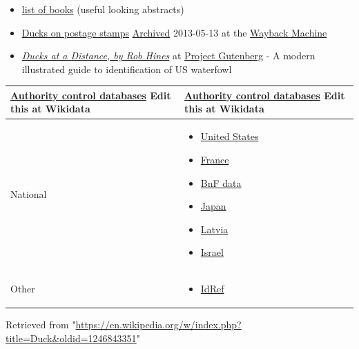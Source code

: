 \documentclass[11pt,a4paper]{article}
\begin{document}
\begin{itemize}
\item \href{https://web.archive.org/web/20060613210555/http://seaducks.org/subjects/MIGRATION\%20AND\%20FLIGHT.htm}{list of books} (useful looking abstracts)
\item \href{http://www.stampsbook.org/subject/Duck.html}{Ducks on postage stamps} \href{https://web.archive.org/web/20130513022903/http://www.stampsbook.org/subject/Duck.html}{Archived} 2013-05-13 at the \href{/wiki/Wayback\_Machine}{Wayback Machine}
\item \href{https://gutenberg.org/ebooks/18884}{\textit{Ducks at a Distance, by Rob Hines}} at \href{/wiki/Project\_Gutenberg}{Project Gutenberg} - A modern illustrated guide to identification of US waterfowl
\end{itemize}

\begin{table}[h]
\begin{tabular}{|l|l|}
\hline
\href{/wiki/Help:Authority\_control}{Authority control databases}  %
Edit this at Wikidata & \href{/wiki/Help:Authority\_control}{Authority control databases}  %
Edit this at Wikidata \\ \hline
National & \begin{itemize} \item \href{https://id.loc.gov/authorities/sh85039879}{United States} \item \href{https://catalogue.bnf.fr/ark:/12148/cb119761481}{France} \item \href{https://data.bnf.fr/ark:/12148/cb119761481}{BnF data} \item \href{https://id.ndl.go.jp/auth/ndlna/00564819}{Japan} \item \href{https://kopkatalogs.lv/F?func=direct\&local\_base=lnc10\&doc\_number=000090751\&P\_CON\_LNG=ENG}{Latvia} \item \href{http://olduli.nli.org.il/F/?func=find-b\&local\_base=NLX10\&find\_code=UID\&request=987007565486205171}{Israel} \end{itemize} \\ \hline
Other & \begin{itemize} \item \href{https://www.idref.fr/027796124}{IdRef} \end{itemize} \\ \hline
\end{tabular}
\end{table}

Retrieved from "\href{https://en.wikipedia.org/w/index.php?title=Duck\&oldid=1246843351}{https://en.wikipedia.org/w/index.php?title=Duck\&oldid=1246843351}"
\end{document}
